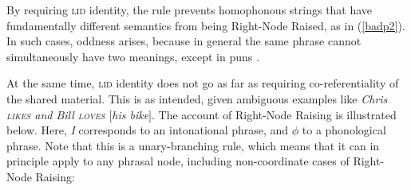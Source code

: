 {\noindent
By requiring  \textsc{lid} identity, the rule prevents homophonous strings that have fundamentally different semantics from being Right-Node Raised, as in (\ref{badp2}). In such cases, oddness arises, because in general the same phrase cannot simultaneously have  two meanings, except in puns  \citep[316]{zaenenkart}. 

\begin{exe}
\ex \begin{xlista} 
\end{xlista}\label{badp2}
\end{exe}

\noindent
At the same time, \textsc{lid} identity does not go as far as requiring co-referentiality of the shared material. This is  as intended, given ambiguous examples like
\emph{Chris \textsc{likes} and Bill \textsc{loves}  $[$his bike$]$}.
The account of Right-Node Raising is illustrated below. Here, \emph{I} corresponds to an intonational phrase,
and  $\phi$ to a phonological phrase.
Note that this is a unary-branching rule, which means that it can in principle apply to any phrasal node, including non-coordinate cases of Right-Node Raising:


\begin{figure}
    \centering


\end{figure}}
